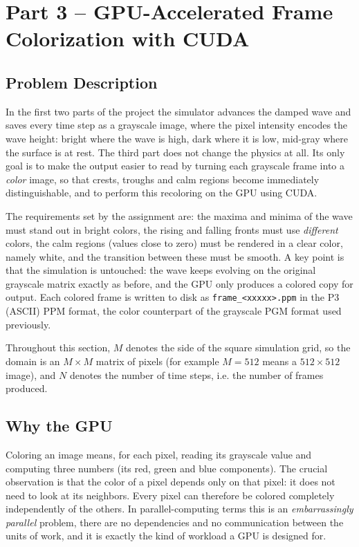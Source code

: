 \section{Part 3 -- GPU-Accelerated Frame Colorization with CUDA}
\label{sec:cuda}

\subsection{Problem Description}
\label{sec:cuda-problem}

In the first two parts of the project the simulator advances the damped wave and
saves every time step as a grayscale image, where the pixel intensity encodes the
wave height: bright where the wave is high, dark where it is low, mid-gray where
the surface is at rest. The third part does not change the physics at all. Its
only goal is to make the output easier to read by turning each grayscale frame
into a \emph{color} image, so that crests, troughs and calm regions become
immediately distinguishable, and to perform this recoloring on the GPU using
CUDA.

The requirements set by the assignment are: the maxima and minima of the wave
must stand out in bright colors, the rising and falling fronts must use
\emph{different} colors, the calm regions (values close to zero) must be rendered
in a clear color, namely white, and the transition between these must be smooth.
A key point is that the simulation is untouched: the wave keeps evolving on the
original grayscale matrix exactly as before, and the GPU only produces a colored
copy for output. Each colored frame is written to disk as
\texttt{frame\_<xxxxx>.ppm} in the P3 (ASCII) PPM format, the color counterpart
of the grayscale PGM format used previously.

Throughout this section, $M$ denotes the side of the square simulation grid, so
the domain is an $M\times M$ matrix of pixels (for example $M=512$ means a
$512\times512$ image), and $N$ denotes the number of time steps, i.e. the number
of frames produced.

\subsection{Why the GPU}
\label{sec:cuda-why}

Coloring an image means, for each pixel, reading its grayscale value and
computing three numbers (its red, green and blue components). The crucial
observation is that the color of a pixel depends only on that pixel: it does not
need to look at its neighbors. Every pixel can therefore be colored completely
independently of the others. In parallel-computing terms this is an
\emph{embarrassingly parallel} problem, there are no dependencies and no
communication between the units of work, and it is exactly the kind of workload
a GPU is designed for.


